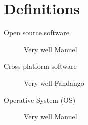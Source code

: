 \chapter{Definitions}

\begin{description}
	\item [Open source software]
	Very well Manuel

	\item [Cross-platform software]
	Very well Fandango

	\item [Operative System (OS)]
	Very well Manuel


\end{description}

